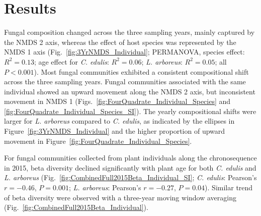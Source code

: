 \section{Results}
Fungal composition changed across the three sampling years, mainly captured by the NMDS 2 axis, whereas the effect of host species was represented by the NMDS 1 axis (Fig.~\ref{fig:3YrNMDS_Individual}; PERMANOVA, species effect: $R^{2}=0.13$; age effect for \textit{C. edulis}: $R^{2}=0.06$; \textit{L. arboreus}: $R^{2}=0.05$; all $P<0.001$).  
Most fungal communities exhibited a consistent compositional shift across the three sampling years. Fungal communities associated with the same individual showed an upward movement along the NMDS 2 axis, but inconsistent movement in NMDS 1 (Figs.~\ref{fig:FourQuadrate_Individual_Species} and \ref{fig:FourQuadrate_Individual_Species_SI}).
The yearly compositional shifts were larger for \textit{L. arboreus} compared to \textit{C. edulis}, as indicated by the ellipses in Figure~\ref{fig:3YrNMDS_Individual} and the higher proportion of upward movement in Figure~\ref{fig:FourQuadrate_Individual_Species}.
\par


For fungal communities collected from plant individuals along the chronosequence in 2015, beta diversity declined significantly with plant age for both \textit{C. edulis} and \textit{L. arboreus} (Fig.~\ref{fig:CombinedFull2015Beta_Individual_SI}; \textit{C. edulis}: Pearson's $r=-0.46$, $P=0.001$; \textit{L. arboreus}:  Pearson's $r=-0.27$, $P=0.04$). Similar trend of beta diversity were observed with a three-year moving window averaging (Fig.~\ref{fig:CombinedFull2015Beta_Individual}).
\par


